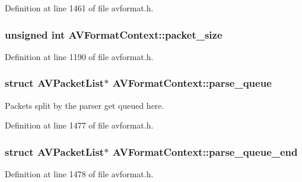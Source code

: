Definition at line 1461 of file avformat.\+h.

\subsubsection[{\texorpdfstring{packet\+\_\+size}{packet_size}}]{\setlength{\rightskip}{0pt plus 5cm}unsigned {\bf int} A\+V\+Format\+Context\+::packet\+\_\+size}\hypertarget{struct_a_v_format_context_a0739c2952969d3c67788f02ea829f549}{}\label{struct_a_v_format_context_a0739c2952969d3c67788f02ea829f549}


Definition at line 1190 of file avformat.\+h.

\subsubsection[{\texorpdfstring{parse\+\_\+queue}{parse_queue}}]{\setlength{\rightskip}{0pt plus 5cm}struct {\bf A\+V\+Packet\+List}$\ast$ A\+V\+Format\+Context\+::parse\+\_\+queue}\hypertarget{struct_a_v_format_context_acfa90f811da6e2727288e04c88eb102a}{}\label{struct_a_v_format_context_acfa90f811da6e2727288e04c88eb102a}
Packets split by the parser get queued here. 

Definition at line 1477 of file avformat.\+h.

\subsubsection[{\texorpdfstring{parse\+\_\+queue\+\_\+end}{parse_queue_end}}]{\setlength{\rightskip}{0pt plus 5cm}struct {\bf A\+V\+Packet\+List}$\ast$ A\+V\+Format\+Context\+::parse\+\_\+queue\+\_\+end}\hypertarget{struct_a_v_format_context_a756b1fa44fb1b8e2adf0594f7e0d4ab1}{}\label{struct_a_v_format_context_a756b1fa44fb1b8e2adf0594f7e0d4ab1}


Definition at line 1478 of file avformat.\+h.

